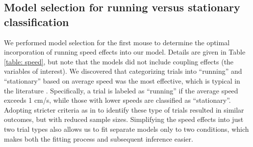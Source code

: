 \documentclass[12pt]{article}
\begin{document}
\subsection*{Model selection for running versus stationary classification}

We performed model selection for the first mouse to determine the optimal incorporation of running speed effects into our model. Details are given in Table \ref{table: speed}, but note that the models did not include coupling effects (the variables of interest). We discovered that categorizing trials into ``running'' and ``stationary'' based on average speed was the most effective, which is typical in the literature \cite{niell2010modulation, keller2012sensorimotor, dadarlat2017locomotion, pillow2022reduced}. Specifically, a trial is labeled as ``running'' if the average speed exceeds 1 cm/s, while those with lower speeds are classified as ``stationary''. Adopting stricter criteria as in \citep{pillow2022reduced} to identify these type of trials resulted in similar outcomes, but with reduced sample sizes. Simplifying the speed effects into just two trial types also allows us to fit separate models only to two conditions, which makes both the fitting process and subsequent inference easier.
\end{document}
